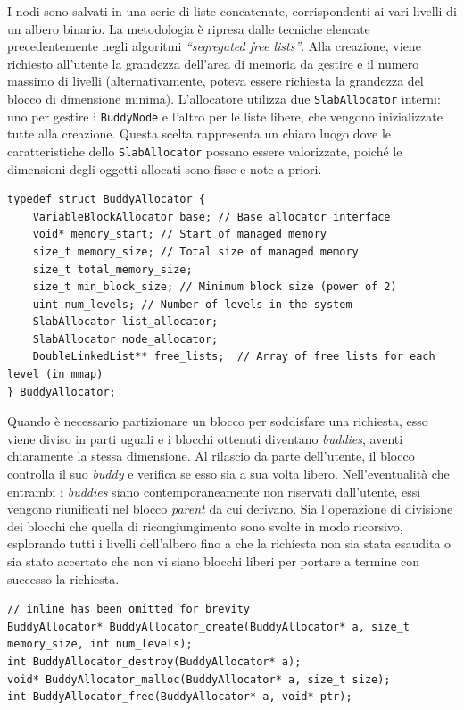 I nodi sono salvati in una serie di liste concatenate, corrispondenti ai vari livelli di un albero binario. La metodologia è ripresa dalle tecniche elencate precedentemente negli algoritmi \textit{“segregated free lists”}. Alla creazione, viene richiesto all’utente la grandezza dell’area di memoria da gestire e il numero massimo di livelli (alternativamente, poteva essere richiesta la grandezza del blocco di dimensione minima). L'allocatore utilizza due \texttt{SlabAllocator} interni: uno per gestire i \texttt{BuddyNode} e l'altro per le liste libere, che vengono inizializzate tutte alla creazione. Questa scelta rappresenta un chiaro luogo dove le caratteristiche dello \texttt{SlabAllocator} possano essere valorizzate, poiché le dimensioni degli oggetti allocati sono fisse e note a priori.

\begin{lstlisting}
typedef struct BuddyAllocator {
    VariableBlockAllocator base; // Base allocator interface
    void* memory_start; // Start of managed memory
    size_t memory_size; // Total size of managed memory
    size_t total_memory_size;
    size_t min_block_size; // Minimum block size (power of 2)
    uint num_levels; // Number of levels in the system
    SlabAllocator list_allocator;
    SlabAllocator node_allocator;
    DoubleLinkedList** free_lists;  // Array of free lists for each level (in mmap)
} BuddyAllocator;
\end{lstlisting}

Quando è necessario partizionare un blocco per soddisfare una richiesta, esso viene diviso in parti uguali e i blocchi ottenuti diventano \textit{buddies}, aventi chiaramente la stessa dimensione. Al rilascio da parte dell’utente, il blocco controlla il suo \textit{buddy} e verifica se esso sia a sua volta libero.
Nell’eventualità che entrambi i \textit{buddies} siano contemporaneamente non riservati dall’utente, essi vengono riunificati nel blocco \textit{parent} da cui derivano. Sia l'operazione di divisione dei blocchi che quella di ricongiungimento sono svolte in modo ricorsivo, esplorando tutti i livelli dell'albero fino a che la richiesta non sia stata esaudita o sia stato accertato che non vi siano blocchi liberi per portare a termine con successo la richiesta. 

\begin{lstlisting}
// inline has been omitted for brevity
BuddyAllocator* BuddyAllocator_create(BuddyAllocator* a, size_t memory_size, int num_levels);
int BuddyAllocator_destroy(BuddyAllocator* a);
void* BuddyAllocator_malloc(BuddyAllocator* a, size_t size);
int BuddyAllocator_free(BuddyAllocator* a, void* ptr);
\end{lstlisting}

